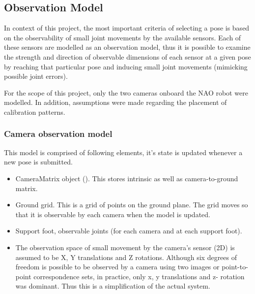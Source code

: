\documentclass[english, printversion, nomenclature, notitle]{tuvisionthesis} %
\begin{document}
\subsection{Observation Model}
In context of this project, the most important criteria of selecting a pose is based on the observability of small joint movements by the available sensors. Each of these sensors are modelled as an observation model, thus it is possible to examine the strength and direction of observable dimensions of each sensor at a given pose by reaching that particular pose and inducing small joint movements (mimicking possible joint errors).

For the scope of this project, only the two cameras onboard the NAO robot were modelled. In addition, assumptions were made regarding the placement of calibration patterns.

\subsubsection{Camera observation model}

This model is comprised of following elements, it's state is updated whenever a new pose is submitted. 
\begin{itemize}
	\item CameraMatrix object ().
	\subitem This stores intrinsic as well as camera-to-ground matrix.
	\item Ground grid. This is a grid of points on the ground plane.
	\subitem The grid moves so that it is observable by each camera when the model is updated.
	\item Support foot, observable joints (for each camera and at each support foot). 
	\item The observation space of small movement by the camera's sensor (2D) is assumed to be X, Y translations and Z rotations.
	\subitem Although six degrees of freedom is possible to be observed by a camera using two images or point-to-point correspondence sets, in practice, only x, y translations and z- rotation was dominant.  Thus this is a simplification of the actual system.
\end{itemize}
\end{document}
